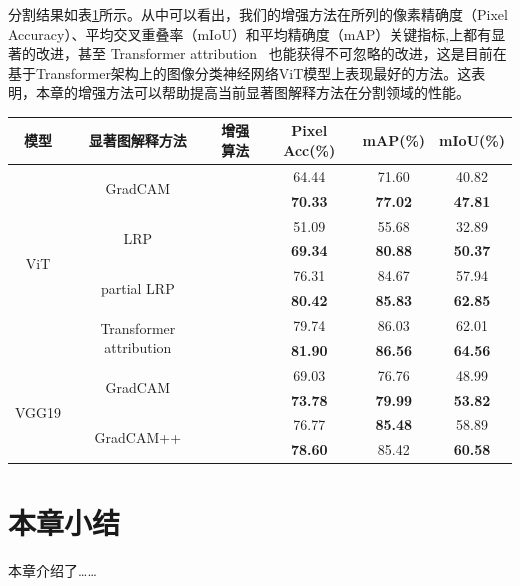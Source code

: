 分割结果如表\ref{tab:seg}所示。从中可以看出，我们的增强方法在所列的像素精确度（Pixel Accuracy）、平均交叉重叠率（mIoU）和平均精确度（mAP）关键指标,上都有显著的改进，甚至 Transformer attribution~\cite{chefer2021transformer} 也能获得不可忽略的改进，这是目前在基于Transformer架构上的图像分类神经网络ViT模型上表现最好的方法。这表明，本章的增强方法可以帮助提高当前显著图解释方法在分割领域的性能。
\begin{table}
\renewcommand{\arraystretch}{1.5}
\centering
{}
\wuhao
	\label{tab:seg}
	\begin{tabular}{cccccc} 
		\hline
		模型                     & 显著图解释方法                                  & 增强算法 & Pixel Acc(\%)      & mAP(\%)             & mIoU(\%)             \\ 
		\hline
		\multirow{8}{*}{ViT}   & \multirow{2}{*}{GradCAM}                 &      & 64.44          & 71.60          & 40.82           \\ 
		\cline{3-6}
		&                                          & \checkmark    & \textbf{70.33} & \textbf{77.02} & \textbf{47.81}  \\ 
		\cline{2-6}
		& \multirow{2}{*}{LRP}                     &      & 51.09          & 55.68          & 32.89           \\ 
		\cline{3-6}
		&                                          & \checkmark    & \textbf{69.34} & \textbf{80.88} & \textbf{50.37}  \\ 
		\cline{2-6}
		& \multirow{2}{*}{partial LRP}             &      & 76.31          & 84.67          & 57.94           \\ 
		\cline{3-6}
		&                                          & \checkmark    & \textbf{80.42} & \textbf{85.83} & \textbf{62.85}  \\ 
		\cline{2-6}
		& \multirow{2}{*}{Transformer attribution} &      & 79.74          & 86.03          & 62.01           \\ 
		\cline{3-6}
		&                                          & \checkmark    & \textbf{81.90} & \textbf{86.56} & \textbf{64.56}  \\ 
		\hline
		\multirow{4}{*}{VGG19} & \multirow{2}{*}{GradCAM}                 &      & 69.03          & 76.76          & 48.99           \\ 
		\cline{3-6}
		&                                          & \checkmark    & \textbf{73.78} & \textbf{79.99} & \textbf{53.82}  \\ 
		\cline{2-6}
		& \multirow{2}{*}{GradCAM++}               &      & 76.77          & \textbf{85.48} & 58.89           \\ 
		\cline{3-6}
		&                                          & \checkmark    & \textbf{78.60} & 85.42          & \textbf{60.58}  \\
		\hline
	\end{tabular}
\end{table}
	
\section{本章小结}
	本章介绍了……